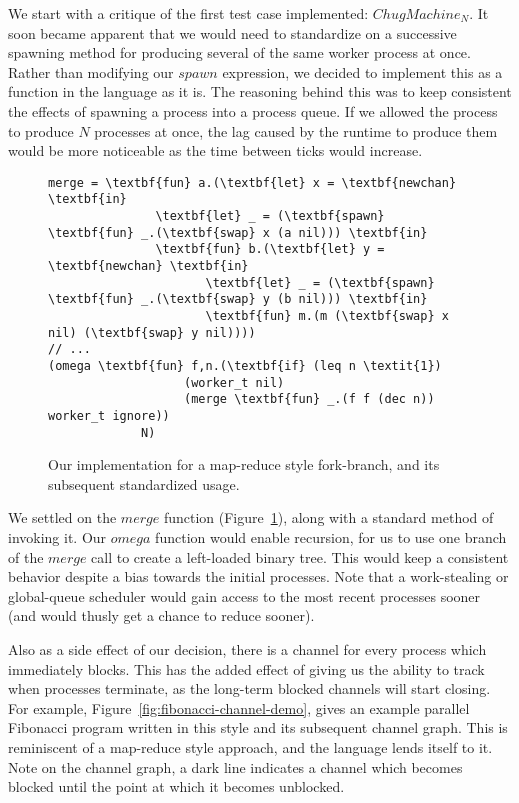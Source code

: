 We start with a critique of the first test case implemented: $ChugMachine_N$. It
soon became apparent that we would need to standardize on a successive spawning
method for producing several of the same worker process at once. Rather than modifying
our $spawn$ expression, we decided to implement this as a function in the language
as it is. The reasoning behind this was to keep consistent the effects of 
spawning a process into a process queue. If we allowed the process to produce $N$
processes at once, the lag caused by the runtime to produce them would be 
more noticeable as the time between ticks would increase.

\begin{figure}
    \centering
{\footnotesize
\begin{BVerbatim}[commandchars=\\\{\}]
merge = \textbf{fun} a.(\textbf{let} x = \textbf{newchan} \textbf{in}
               \textbf{let} _ = (\textbf{spawn} \textbf{fun} _.(\textbf{swap} x (a nil))) \textbf{in}
               \textbf{fun} b.(\textbf{let} y = \textbf{newchan} \textbf{in} 
                      \textbf{let} _ = (\textbf{spawn} \textbf{fun} _.(\textbf{swap} y (b nil))) \textbf{in}
                      \textbf{fun} m.(m (\textbf{swap} x nil) (\textbf{swap} y nil))))
// ...
(omega \textbf{fun} f,n.(\textbf{if} (leq n \textit{1}) 
                   (worker_t nil) 
                   (merge \textbf{fun} _.(f f (dec n)) worker_t ignore)) 
             N)
\end{BVerbatim}
}
    \caption{Our implementation for a map-reduce style fork-branch, and its 
    subsequent standardized usage.}
    \label{fig:merge-code}
\end{figure}

We settled on the $merge$ function (Figure~\ref{fig:merge-code}), along with a 
standard method of invoking it. Our $omega$ function would enable recursion, 
for us to use one branch of the $merge$ call to create a left-loaded binary
tree. This would keep a consistent behavior despite a bias towards the initial 
processes. Note that a work-stealing or global-queue scheduler would gain
access to the most recent processes sooner (and would thusly get a chance to
reduce sooner). 

Also as a side effect of our decision, there is a channel for every process which
immediately blocks. This has the added effect of giving us the ability to track when 
processes terminate, as the long-term blocked channels will start closing. For
example, Figure~\ref{fig:fibonacci-channel-demo}, gives an example parallel
Fibonacci program written in this style and its subsequent channel graph. This
is reminiscent of a map-reduce style approach, and the language lends itself
to it. Note on the channel graph, a dark line indicates a channel which 
becomes blocked until the point at which it becomes unblocked. 

